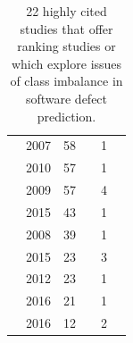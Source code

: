 \documentclass[10pt,conference]{IEEEtran}
\newcommand{\cmark}{\ding{51}}%
\newcommand{\xmark}{\ding{55}}%
\theoremstyle{break}
\theoremstyle{break}
\newcommand{\sma}{{\sc SMOTE}}
\newcommand{\smb}{{\sc SMOTUNED}}
\begin{document}
\begin{table}[!t]
\begin{tabular}{c@{~}|c@{~}|c@{~}|c@{~}|c@{~}|c@{~}}
        \cite{pelayo2007applying} & 2007 & 58 & \xmark & 1 & \cmark \\  
        \cite{khoshgoftaar2010attribute} & 2010 & 57 & \cmark & 1 & \cmark  \\  
        \cite{jiang2009variance} & 2009 & 57 & \cmark & 4 & \xmark  \\  
        \cite{ghotra2015revisiting} & 2015 & 43 & \cmark & 1 & \xmark  \\  
        \cite{jiang2008can} & 2008 & 39 & \cmark & 1 & \cmark  \\  
        \cite{tan2015online} & 2015 & 23 & \xmark & 3 & \cmark \\  
        \cite{pelayo2012evaluating} & 2012 & 23 & \xmark & 1 & \cmark \\  
        \cite{tantithamthavorn2016automated} & 2016 & 21 & \cmark & 1 & \xmark\\  
        \cite{fu2016tuning} & 2016 & 12 & \cmark & 2 & \xmark  \\    
\end{tabular}
\caption{22 highly cited studies
that offer    ranking studies or
which explore issues of class imbalance in
software defect prediction.}
\label{tbl:survey2}
\vspace{-0.5cm}
\end{table}





 
 
 

\end{document}
